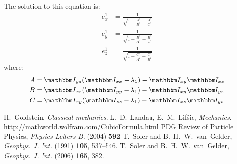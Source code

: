 \documentclass[a4paper,11pt]{article}
\newcommand{\itm}{\mathbbm I}
\newcommand{\itc}[1]{\itm_{#1}}
\begin{document}
The solution to this equation is:
\begin{align}
e^1_x &= \frac{1}{\sqrt{1 + \frac{A^2}{B^2} + \frac{A^2}{C^2}}}\\
e^1_y &= \frac{1}{\sqrt{1 + \frac{B^2}{A^2} + \frac{B^2}{C^2}}}\\
e^1_z &= \frac{1}{\sqrt{1 + \frac{C^2}{A^2} + \frac{C^2}{B^2}}}
\end{align}
where:
\begin{align}
A &= \itc{yz}(\itc{xx} - \lambda_1) - \itc{xy}\itc{xz}\\
B &= \itc{xz}(\itc{yy} - \lambda_1) - \itc{xy}\itc{yz}\\
C &= \itc{xy}(\itc{zz} - \lambda_1) - \itc{xz}\itc{yz}
\end{align}



\begin{thebibliography}{100}
H.~Goldstein, \emph{Classical mechanics}.
L.~D.~Landau, E.~M.~Lif\^sic, \emph{Mechanics}.
\url{http://mathworld.wolfram.com/CubicFormula.html}
PDG Review of Particle Physics,
  \emph{Physics Letters B.} (2004) {\bf 592}
T.~Soler and B.~H.~W.~van~Gelder,
  \emph{Geophys. J. Int.} (1991) {\bf 105}, 537--546.
T.~Soler and B.~H.~W.~van~Gelder,
  \emph{Geophys. J. Int.} (2006) {\bf 165}, 382.
\end{thebibliography}
\end{document}
